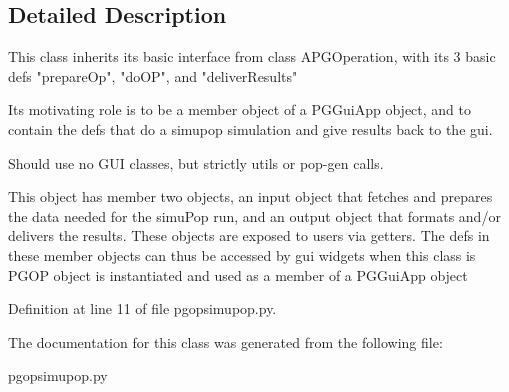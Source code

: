 \subsection{Detailed Description}
\begin{DoxyVerb}This class inherits its basic interface from class APGOperation, with its 3
basic defs "prepareOp", "doOP", and "deliverResults"

Its motivating role is to be a member object of a PGGuiApp object, and to contain the
defs that do a simupop simulation and give results back to the gui.

Should use no GUI classes, but strictly utils or pop-gen calls.

This object has member two objects, an input object that fetches and prepares the
data needed for the simuPop run, and an output object that formats and/or delivers
the results.   These objects are exposed to users via getters.  The defs in these 
member objects can thus be accessed by gui widgets when this class is PGOP object 
is instantiated and used as a member of a PGGuiApp object
\end{DoxyVerb}
 

Definition at line 11 of file pgopsimupop.\+py.



The documentation for this class was generated from the following file\+:\begin{DoxyCompactItemize}
\item 
pgopsimupop.\+py\end{DoxyCompactItemize}
